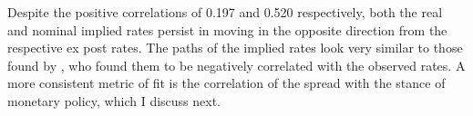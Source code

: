 Despite the positive correlations of 0.197 and 0.520 respectively, both the real and nominal implied rates persist in moving in the opposite direction from the respective ex post rates. The paths of the implied rates look very similar to those found by \cite{canzoneri07}, who found them to be negatively correlated with the observed rates. A more consistent metric of fit is the correlation of the spread with the stance of monetary policy, which I discuss next.

